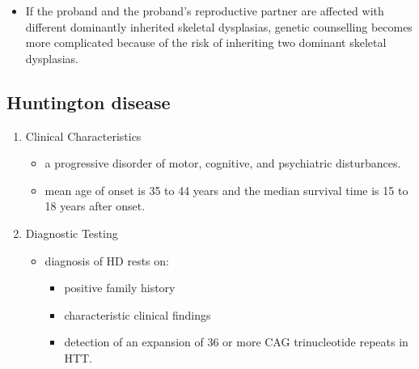 \documentclass[12pt]{scrartcl}
\begin{document}
\begin{enumerate}
\begin{itemize}
\item If the proband and the proband's reproductive partner are affected
with different dominantly inherited skeletal dysplasias, genetic
counselling becomes more complicated because of the risk of
inheriting two dominant skeletal dysplasias.
\end{itemize}
\end{enumerate}
\subsection{Huntington disease}
\label{sec:org87e47a8}
\begin{enumerate}
\item Clinical Characteristics
\label{sec:org75c45ad}
\begin{itemize}
\item a progressive disorder of motor, cognitive, and psychiatric
disturbances.
\item mean age of onset is 35 to 44 years and the median survival time is
15 to 18 years after onset.
\end{itemize}
\item Diagnostic Testing
\label{sec:org12cfff3}
\begin{itemize}
\item diagnosis of HD rests on:
\begin{itemize}
\item positive family history
\item characteristic clinical findings
\item detection of an expansion of 36 or more CAG trinucleotide repeats in HTT.
\end{itemize}


\end{itemize}
\end{enumerate}
\end{document}
